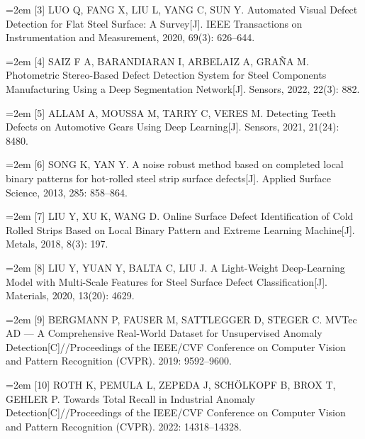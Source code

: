 {\small\noindent\hangindent=2em \hypertarget{ref:3}{}[3] LUO Q, FANG X, LIU L, YANG C, SUN Y. Automated Visual Defect Detection for Flat Steel Surface: A Survey[J]. IEEE Transactions on Instrumentation and Measurement, 2020, 69(3): 626–644.\par}

{\small\noindent\hangindent=2em \hypertarget{ref:4}{}[4] SAIZ F A, BARANDIARAN I, ARBELAIZ A, GRAÑA M. Photometric Stereo-Based Defect Detection System for Steel Components Manufacturing Using a Deep Segmentation Network[J]. Sensors, 2022, 22(3): 882.\par}

{\small\noindent\hangindent=2em \hypertarget{ref:5}{}[5] ALLAM A, MOUSSA M, TARRY C, VERES M. Detecting Teeth Defects on Automotive Gears Using Deep Learning[J]. Sensors, 2021, 21(24): 8480.\par}

{\small\noindent\hangindent=2em \hypertarget{ref:6}{}[6] SONG K, YAN Y. A noise robust method based on completed local binary patterns for hot-rolled steel strip surface defects[J]. Applied Surface Science, 2013, 285: 858–864.\par}

{\small\noindent\hangindent=2em \hypertarget{ref:7}{}[7] LIU Y, XU K, WANG D. Online Surface Defect Identification of Cold Rolled Strips Based on Local Binary Pattern and Extreme Learning Machine[J]. Metals, 2018, 8(3): 197.\par}

{\small\noindent\hangindent=2em \hypertarget{ref:8}{}[8] LIU Y, YUAN Y, BALTA C, LIU J. A Light-Weight Deep-Learning Model with Multi-Scale Features for Steel Surface Defect Classification[J]. Materials, 2020, 13(20): 4629.\par}

{\small\noindent\hangindent=2em \hypertarget{ref:9}{}[9] BERGMANN P, FAUSER M, SATTLEGGER D, STEGER C. MVTec AD — A Comprehensive Real-World Dataset for Unsupervised Anomaly Detection[C]//Proceedings of the IEEE/CVF Conference on Computer Vision and Pattern Recognition (CVPR). 2019: 9592–9600.\par}

{\small\noindent\hangindent=2em \hypertarget{ref:10}{}[10] ROTH K, PEMULA L, ZEPEDA J, SCHÖLKOPF B, BROX T, GEHLER P. Towards Total Recall in Industrial Anomaly Detection[C]//Proceedings of the IEEE/CVF Conference on Computer Vision and Pattern Recognition (CVPR). 2022: 14318–14328.\par}

